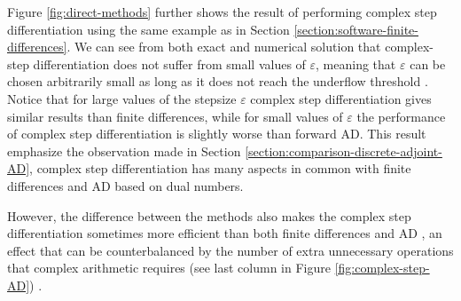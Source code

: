 Figure \ref{fig:direct-methods} further shows the result of performing complex step differentiation using the same example as in Section \ref{section:software-finite-differences}.
We can see from both exact and numerical solution that complex-step differentiation does not suffer from small values of $\varepsilon$, meaning that $\varepsilon$ can be chosen arbitrarily small \cite{martins2001connection} as long as it does not reach the underflow threshold \cite{Goldberg_1991_floatingpoint}. 
Notice that for large values of the stepsize $\varepsilon$ complex step differentiation gives similar results than finite differences, while for small values of $\varepsilon$ the performance of complex step differentiation is slightly worse than forward AD. 
This result emphasize the observation made in Section \ref{section:comparison-discrete-adjoint-AD}, complex step differentiation has many aspects in common with finite differences and AD based on dual numbers. 

However, the difference between the methods also makes the complex step differentiation sometimes more efficient than both finite differences and AD \cite{Lantoine_Russell_Dargent_2012}, an effect that can be counterbalanced by the number of extra unnecessary operations that complex arithmetic requires (see last column in Figure \ref{fig:complex-step-AD}) \cite{Martins_Sturdza_Alonso_2003_complex_differentiation}.
